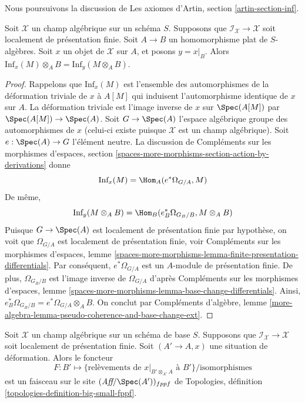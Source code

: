 \noindent
Nous poursuivons la discussion de
Les axiomes d'Artin, section \ref{artin-section-inf}.

\begin{lemma}
\label{lemma-inf-quasi-coherent}
Soit $\mathcal{X}$ un champ algébrique sur un schéma $S$.
Supposons que $\mathcal{I}_\mathcal{X} \to \mathcal{X}$ soit localement
de présentation finie. Soit $A \to B$ un homomorphisme plat de $S$-algèbres.
Soit $x$ un objet de $\mathcal{X}$ sur $A$, et posons $y = x|_B$.
Alors $\text{Inf}_x(M) \otimes_A B = \text{Inf}_y(M \otimes_A B)$.
\end{lemma}

\begin{proof}
Rappelons que $\text{Inf}_x(M)$ est l'ensemble des automorphismes de la
déformation triviale de $x$ à $A[M]$ qui induisent l'automorphisme
identique de $x$ sur $A$. La déformation triviale est
l'image inverse de $x$ sur $\Spec(A[M])$ par $\Spec(A[M]) \to \Spec(A)$.
Soit $G \to \Spec(A)$ l'espace algébrique groupe des automorphismes de $x$
(celui-ci existe puisque $\mathcal{X}$ est un champ algébrique).
Soit $e : \Spec(A) \to G$ l'élément neutre.
La discussion de Compléments sur les morphismes d'espaces, section
\ref{spaces-more-morphisms-section-action-by-derivations}
donne
$$
\text{Inf}_x(M) = \Hom_A(e^*\Omega_{G/A}, M)
$$
De même,
$$
\text{Inf}_y(M \otimes_A B) = \Hom_B(e_B^*\Omega_{G_B/B}, M \otimes_A B)
$$
Puisque $G \to \Spec(A)$ est localement de présentation finie par
hypothèse, on voit que $\Omega_{G/A}$ est localement de
présentation finie, voir
Compléments sur les morphismes d'espaces, lemme
\ref{spaces-more-morphisms-lemma-finite-presentation-differentials}.
Par conséquent, $e^*\Omega_{G/A}$ est un $A$-module de présentation finie.
De plus, $\Omega_{G_B/B}$ est l'image inverse de $\Omega_{G/A}$ d'après
Compléments sur les morphismes d'espaces, lemme
\ref{spaces-more-morphisms-lemma-base-change-differentials}.
Ainsi, $e_B^*\Omega_{G_B/B} = e^*\Omega_{G/A} \otimes_A B$.
On conclut par Compléments d'algèbre, lemme
\ref{more-algebra-lemma-pseudo-coherence-and-base-change-ext}.
\end{proof}

\begin{lemma}
\label{lemma-sheaf-of-infinitesimal-lifts}
Soit $\mathcal{X}$ un champ algébrique sur un schéma de base $S$.
Supposons que $\mathcal{I}_\mathcal{X} \to \mathcal{X}$ soit localement
de présentation finie. Soit $(A' \to A, x)$ une situation de déformation.
Alors le foncteur
$$
F : B' \longmapsto
\{\text{relèvements de }x|_{B' \otimes_{A'} A}\text{ à } B'\}/\text{isomorphismes}
$$
est un faisceau sur le site $(\textit{Aff}/\Spec(A'))_{fppf}$ de
Topologies, définition \ref{topologies-definition-big-small-fppf}.
\end{lemma}

